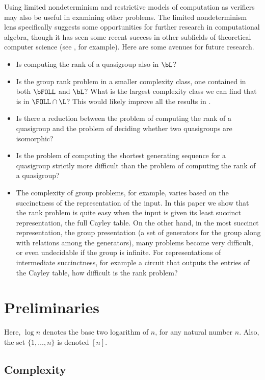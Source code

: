 \documentclass{article}
\begin{document}

Using limited nondeterminism and restrictive models of computation as verifiers may also be useful in examining other problems.
The limited nondeterminism lens specifically suggests some opportunities for further research in computational algebra, though it has seen some recent success in other subfields of theoretical computer science (see \autocite{gottlob13}, for example).
Here are some avenues for future research.
\begin{itemize}
\item Is computing the rank of a quasigroup also in $\bL$?
\item
  Is the group rank problem in a smaller complexity class, one contained in both $\bFOLL$ and $\bL$?
  What is the largest complexity class we can find that is in $\FOLL \cap \L$?
  This would likely improve all the results in \autocite{bklm01}.
\item Is there a reduction between the problem of computing the rank of a quasigroup and the problem of deciding whether two quasigroups are isomorphic?
\item Is the problem of computing the shortest generating sequence for a quasigroup strictly more difficult than the problem of computing the rank of a quasigroup?
\item
  The complexity of group problems, for example, varies based on the succinctness of the representation of the input.
  In this paper we show that the rank problem is quite easy when the input is given its least succinct representation, the full Cayley table.
  On the other hand, in the most succinct representation, the group presentation (a set of generators for the group along with relations among the generators), many problems become very difficult, or even undecidable if the group is infinite.
  For representations of intermediate succinctness, for example a circuit that outputs the entries of the Cayley table, how difficult is the rank problem?
\end{itemize}


\section{Preliminaries}

Here, $\log n$ denotes the base two logarithm of $n$, for any natural number $n$.
Also, the set $\{1, \dotsc, n\}$ is denoted $[n]$.

\subsection{Complexity}
\end{document}
